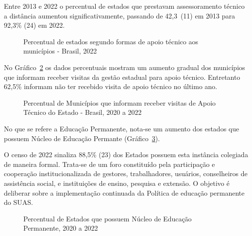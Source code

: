 \documentclass[
  letterpaper,
  DIV=11,
  numbers=noendperiod]{scrreprt}
\begin{document}
Entre 2013 e 2022 o percentual de estados que prestavam assessoramento
técnico a distância aumentou significativamente, passando de 42,3\     (11)
em 2013 para 92,3\% (24) em 2022.

\begin{figure}


\caption{\label{fig-estados-formas-apoio}Percentual de estados segundo
formas de apoio técnico aos municípios - Brasil, 2022}

\end{figure}%

No Gráfico~\ref{fig-munic_vit_estadual} os dados percentuais mostram um
aumento gradual dos municípios que informam receber visitas da gestão
estadual para apoio técnico. Entretanto 62,5\% informam não ter recebido
visita de apoio técnico no último ano.

\begin{figure}


\caption{\label{fig-munic_vit_estadual}Percentual de Municípios que
informam receber visitas de Apoio Técnico do Estado - Brasil, 2020 a
2022}

\end{figure}%

No que se refere a Educação Permanente, nota-se um aumento dos estados
que possuem Núcleo de Educação Permante (Gráfico~\ref{fig-NUEP}).

O censo de 2022 sinaliza 88,5\% (23) dos Estados possuem esta instância
colegiada de maneira formal. Trata-se de um foro constituído pela
participação e cooperação institucionalizada de gestores, trabalhadores,
usuários, conselheiros de assistência social, e instituições de ensino,
pesquisa e extensão. O objetivo é deliberar sobre a implementação
continuada da Política de educação permanente do SUAS.

\begin{figure}


\caption{\label{fig-NUEP}Percentual de Estados que possuem Núcleo de
Educação Permanente, 2020 a 2022}

\end{figure}%
\end{document}
